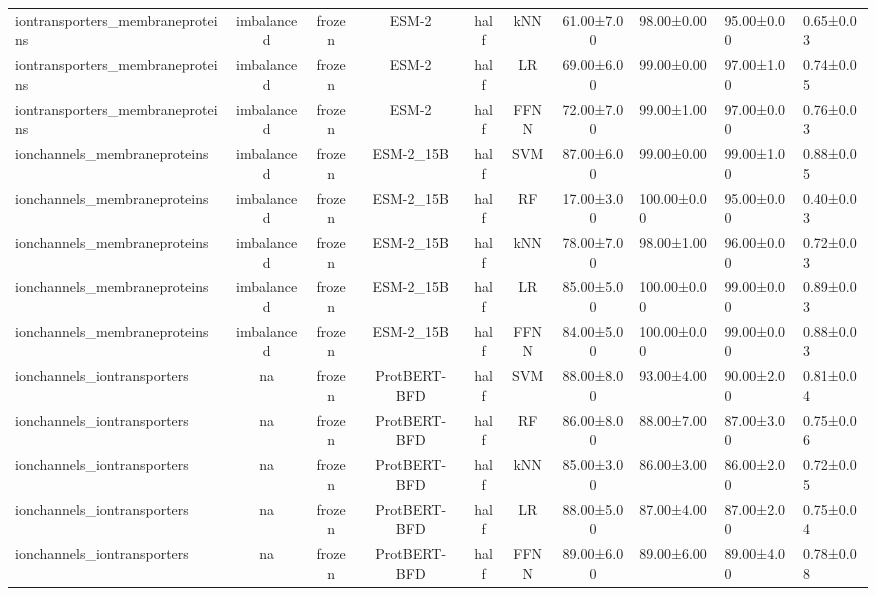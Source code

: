 \begin{tabular}{lcccccc}
iontransporters\_membraneproteins & imbalanced &         frozen &        ESM-2 &      half &        kNN &  61.00±7.00 &  98.00±0.00 &  95.00±0.00 & 0.65±0.03 \\
iontransporters\_membraneproteins & imbalanced &         frozen &        ESM-2 &      half &         LR &  69.00±6.00 &  99.00±0.00 &  97.00±1.00 & 0.74±0.05 \\
iontransporters\_membraneproteins & imbalanced &         frozen &        ESM-2 &      half &       FFNN &  72.00±7.00 &  99.00±1.00 &  97.00±0.00 & 0.76±0.03 \\
    ionchannels\_membraneproteins & imbalanced &         frozen &    ESM-2\_15B &      half &        SVM &  87.00±6.00 &  99.00±0.00 &  99.00±1.00 & 0.88±0.05 \\
    ionchannels\_membraneproteins & imbalanced &         frozen &    ESM-2\_15B &      half &         RF &  17.00±3.00 & 100.00±0.00 &  95.00±0.00 & 0.40±0.03 \\
    ionchannels\_membraneproteins & imbalanced &         frozen &    ESM-2\_15B &      half &        kNN &  78.00±7.00 &  98.00±1.00 &  96.00±0.00 & 0.72±0.03 \\
    ionchannels\_membraneproteins & imbalanced &         frozen &    ESM-2\_15B &      half &         LR &  85.00±5.00 & 100.00±0.00 &  99.00±0.00 & 0.89±0.03 \\
    ionchannels\_membraneproteins & imbalanced &         frozen &    ESM-2\_15B &      half &       FFNN &  84.00±5.00 & 100.00±0.00 &  99.00±0.00 & 0.88±0.03 \\
     ionchannels\_iontransporters &         na &         frozen & ProtBERT-BFD &      half &        SVM &  88.00±8.00 &  93.00±4.00 &  90.00±2.00 & 0.81±0.04 \\
     ionchannels\_iontransporters &         na &         frozen & ProtBERT-BFD &      half &         RF &  86.00±8.00 &  88.00±7.00 &  87.00±3.00 & 0.75±0.06 \\
     ionchannels\_iontransporters &         na &         frozen & ProtBERT-BFD &      half &        kNN &  85.00±3.00 &  86.00±3.00 &  86.00±2.00 & 0.72±0.05 \\
     ionchannels\_iontransporters &         na &         frozen & ProtBERT-BFD &      half &         LR &  88.00±5.00 &  87.00±4.00 &  87.00±2.00 & 0.75±0.04 \\
     ionchannels\_iontransporters &         na &         frozen & ProtBERT-BFD &      half &       FFNN &  89.00±6.00 &  89.00±6.00 &  89.00±4.00 & 0.78±0.08 \\

\end{tabular}
